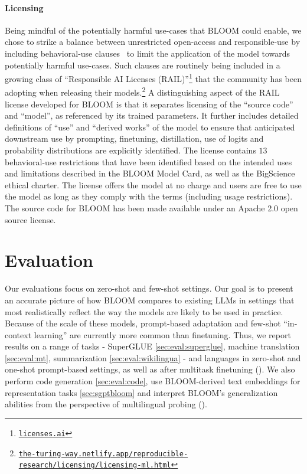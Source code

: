 \documentclass[twoside,11pt]{article}
\begin{document}
\paragraph{Licensing}
Being mindful of the potentially harmful use-cases that BLOOM could enable, we chose to strike a balance between unrestricted open-access and responsible-use by including behavioral-use clauses~\citep{LicensingPaper} to limit the application of the model towards potentially harmful use-cases. Such clauses are routinely being included in a growing class of ``Responsible AI Licenses (RAIL)''\footnote{\href{http://licenses.ai}{\texttt{licenses.ai}}} that the community has been adopting when releasing their models.\footnote{\href{https://the-turing-way.netlify.app/reproducible-research/licensing/licensing-ml.html}{\texttt{the-turing-way.netlify.app/reproducible-research/licensing/licensing-ml.html}}} 
A distinguishing aspect of the RAIL license developed for BLOOM is that it separates licensing of the ``source code'' and ``model'', as referenced by its trained parameters. It further includes detailed definitions of ``use'' and ``derived works'' of the model to ensure that anticipated downstream use by prompting, finetuning, distillation, use of logits and probability distributions are explicitly identified. The license contains $13$ behavioral-use restrictions that have been identified based on the intended uses and limitations described in the BLOOM Model Card, as well as the BigScience ethical charter. The license offers the model at no charge and users are free to use the model as long as they comply with the terms (including usage restrictions). The source code for BLOOM has been made available under an Apache 2.0 open source license.

\section{Evaluation}
\label{sec:evaluation}

Our evaluations focus on zero-shot and few-shot settings. Our goal is to present an accurate picture of how BLOOM compares to existing LLMs in settings that most realistically reflect the way the models are likely to be used in practice. Because of the scale of these models, prompt-based adaptation and few-shot ``in-context learning'' are currently more common than finetuning. Thus, we report results on a range of tasks - SuperGLUE \ref{sec:eval:superglue}, machine translation \ref{sec:eval:mt}, summarization \ref{sec:eval:wikilingua} - and languages in zero-shot and one-shot prompt-based settings, as well as after multitask finetuning (). We also perform code generation \ref{sec:eval:code}, use BLOOM-derived text embeddings for representation tasks \ref{sec:sgptbloom} and interpret BLOOM's generalization abilities from the perspective of multilingual probing ().
\end{document}
